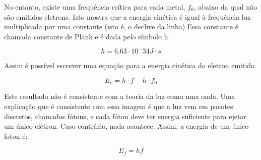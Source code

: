 No entanto, existe uma frequência crítica para cada metal, $f_0$, abaixo da qual não são emitidos eletrons. Isto mostra que a energia cinética é igual à frequência luz multiplicada por uma constante (isto é, o declive da linha) Essa constante é chamada constante de Plank e é dada pelo símbolo h.

\begin{equation}\label{const_plank}
	h= 6.63\cdot 10^-34 J\cdot s 
\end{equation}

Assim é possível escrever uma equação para a energia cinética do eletron emitido.

\begin{equation}
	E_c= h\cdot f - h\cdot f_0
\end{equation}

Este resultado não é consistente com a teoria da luz como uma onda. Uma explicação que é consistente com essa imagem é que a luz vem em pacotes discretos, chamados fótons, e cada fóton deve ter energia suficiente para ejetar um único elétron. Caso contrário, nada acontece. Assim, a energia de um único foton é:

\begin{equation}
	E_f=hf
\end{equation}